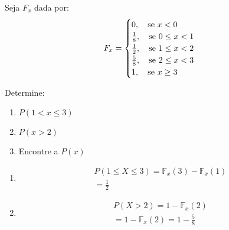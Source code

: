 \documentclass[11pt,a4paper]{book}
\begin{document}
\begin{description}
   \item  [Exemplo:]
   \item  Seja $F_{x}$ dada por:
     \begin{align*}
       F_{x}=\begin{cases} 
         0, \text{\quad se }x<0 \\
         \frac{1}{8},\text{\quad se }0 \le x <1 \\
         \frac{1}{2}, \text{\quad se }1 \le x < 2 \\
         \frac{5}{8}, \text{\quad se }2 \le x < 3 \\
         1,\text{\quad se } x \geq 3
       \end{cases}
     \end{align*}

     Determine: 
     \begin{enumerate}[label=(\alph*)]
       \item $P(1 < x \le 3)$
       \item $P(x>2)$
       \item Encontre a $P(x)$
     \end{enumerate}
     \begin{enumerate}[label= (\alph*)]
       \item 
         \begin{align*}
           P(1 \le X \le 3)= \mathbb{F}_{x}(3) - \mathbb{F}_{x}(1) \\
           = \frac{1}{2}
         \end{align*}
       \item 
         \begin{align*}
           P( X > 2)=1 - \mathbb{F}_{x}(2) \\
           = 1- \mathbb{F}_{x}(2)= 1 - \frac{5}{8}
         \end{align*}


\end{enumerate}
\end{description}
\end{document}

